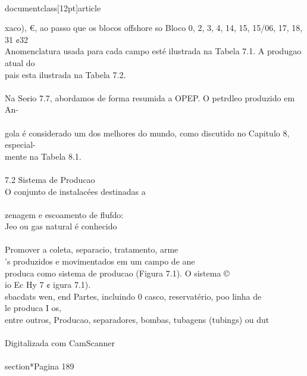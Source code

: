 \\documentclass[12pt]{article}
\begin{document}
xaco), €, ao passo que os blocos offshore so Bloco 0, 2, 3, 4, 14, 15, 15/06, 17, 18, 31 ¢32\\
Anomenclatura usada para cada campo esté ilustrada na Tabela 7.1. A produgao atual do\\
pais esta ilustrada na Tabela 7.2.\\
\\
Na Se¢io 7.7, abordamos de forma resumida a OPEP. O petrdleo produzido em An-\\
\\
gola é considerado um dos melhores do mundo, como discutido no Capitulo 8, especial-\\
mente na Tabela 8.1.\\
\\
7.2 Sistema de Producao\\
O conjunto de instalacées destinadas a\\
\\
zenagem e escoamento de flufdo:\\
Jeo ou gas natural é conhecido\\
\\
Promover a coleta, separacio, tratamento, arme\\
's produzidos e movimentados em um campo de ane\\
produca como sistema de producao (Figura 7.1). O sistema ©\\
io Ec Hy 7 ¢ igura 7.1).\\
sbacdats wen, end Partes, incluindo 0 casco, reservatério, poo linha de\\
le produca I os,\\
entre outros, Producao, separadores, bombas, tubagens (tubings) ou dut\\
\\
Digitalizada com CamScanner\\

\\section*{Pagina 189}
\end{document}
